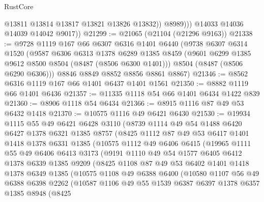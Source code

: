 \begin{lexlean}{RustCore}
\begin{coremodule}
                  @13811
                  @13814
                  @13817
                  @13821
                  @13826
                  @13832))
              @8989)))
        @14033
        @14036
        @14039
        @14042
        @9017))
@21299 := @21065 (@21104 (@21296 @9163))
@21338 := @9728
    @1119
    @167
    @66
    @6307
    @6316
    @1401
    @6440
    (@9738
      @6307
      @6314
      @1520
      (@9587
        @6306
        @6313
        @1378
        @6289
        @1385
        @8459
        (@9601 @6299 @1385 @9612 @8500 @8504 (@8487 (@8506 @6300 @1401)))
        @8504
        (@8487 (@8506 @6290 @6306)))
      @8846
      @8849
      @8852
      @8856
      @8861
      @8867)
@21346 := @8562 @6316 @1119 @167 @66 @1401 @6437 @1401 @1561
@21350 := @8882 @1119 @66 @1401 @6436
@21357 := @11335 @1118 @54 @66 @1401 @6434 @1422 @839
@21360 := @8906 @1118 @54 @6434
@21366 := @8915 @1116 @87 @49 @53 @6432 @1418
@21370 := @10575 @1116 @49 @6421 @6430
@21530 := @19934
    @1115
    @55
    @49
    @6421
    @6428
    @3110
    (@8739
      @1114
      @49
      @54
      @1488
      @6420
      @6427
      @1378
      @6321
      @1385
      @8757
      (@8425
        @1112
        @87
        @49
        @53
        @6417
        @1401
        @1418
        @1378
        @6331
        @1385
        (@10575
          @1112
          @49
          @6406
          @6415
          (@19965
            @1111
            @55
            @49
            @6406
            @6413
            @3173
            (@9191
              @1110
              @49
              @54
              @1577
              @6405
              @6412
              @1378
              @6339
              @1385
              @9209
              (@8425
                @1108
                @87
                @49
                @53
                @6402
                @1401
                @1418
                @1378
                @6349
                @1385
                (@10575
                  @1108
                  @49
                  @6388
                  @6400
                  (@10580
                    @1107
                    @56
                    @49
                    @6388
                    @6398
                    @2262
                    (@10587
                      @1106
                      @49
                      @55
                      @1539
                      @6387
                      @6397
                      @1378
                      @6357
                      @1385
                      @8948
                      (@8425

\end{coremodule}
\end{lexlean}
